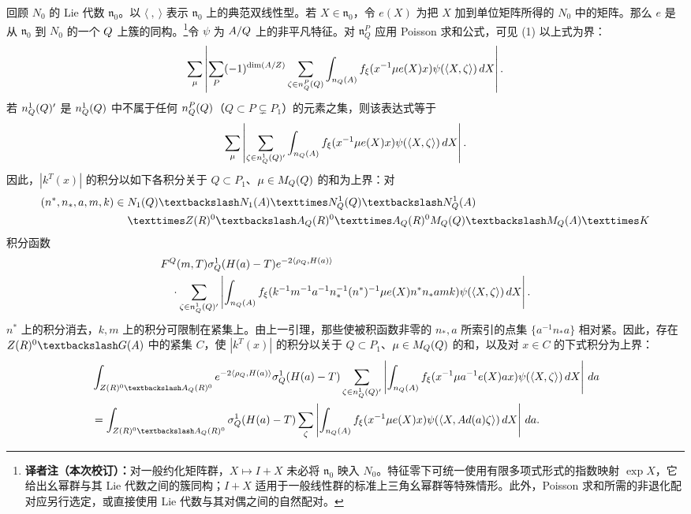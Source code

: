 回顾 $N_0$ 的 Lie 代数 $\mathfrak n_0$。以 $\langle\ ,\ \rangle$ 表示 $\mathfrak n_0$ 上的典范双线性型。若 $X\in\mathfrak n_0$，令 $e(X)$ 为把 $X$ 加到单位矩阵所得的 $N_0$ 中的矩阵。那么 $e$ 是从 $\mathfrak n_0$ 到 $N_0$ 的一个 $Q$ 上簇的同构。\footnote{\textbf{译者注（本次校订）：}对一般约化矩阵群，$X\mapsto I+X$ 未必将 $\mathfrak n_0$ 映入 $N_0$。特征零下可统一使用有限多项式形式的指数映射 $\exp X$，它给出幺幂群与其 Lie 代数之间的簇同构；$I+X$ 适用于一般线性群的标准上三角幺幂群等特殊情形。此外，Poisson 求和所需的非退化配对应另行选定，或直接使用 Lie 代数与其对偶之间的自然配对。}令 $\psi$ 为 $A/Q$ 上的非平凡特征。对 $\mathfrak n_Q^P$ 应用 Poisson 求和公式，可见 (1) 以上式为界：
\[
 \sum_\mu\left|\sum_P(-1)^{\dim(A/Z)}
 \sum_{\zeta\in n_Q^P(Q)}\int_{n_Q(A)}
 f_\xi(x^{-1}\mu e(X)x)\psi(\langle X,\zeta\rangle)\,dX\right|.
\]
若 $n_Q^1(Q)'$ 是 $n_Q^1(Q)$ 中不属于任何
$n_Q^P(Q)$（$Q\subset P\subsetneq P_1$）的元素之集，则该表达式等于
\[
 \sum_\mu\left|\sum_{\zeta\in n_Q^1(Q)'}\int_{n_Q(A)}
 f_\xi(x^{-1}\mu e(X)x)\psi(\langle X,\zeta\rangle)\,dX\right|.
\]
因此，$|k^T(x)|$ 的积分以如下各积分关于 $Q\subset P_1$、$\mu\in M_Q(Q)$ 的和为上界：对
\[
\begin{split}
 (n^*,n_*,a,m,k)\in{}&N_1(\Q)\backslash N_1(A)
 \times N_Q^1(\Q)\backslash N_Q^1(A)\\
 &\times Z(\R)^0\backslash A_Q(\R)^0
 \times A_Q(\R)^0M_Q(\Q)\backslash M_Q(A)\times K
\end{split}
\]
积分函数
\[
\begin{split}
 &F^Q(m,T)\sigma_Q^1(H(a)-T)e^{-2\langle\rho_Q,H(a)\rangle}\\
 &\quad\cdot\sum_{\zeta\in n_Q^1(Q)'}
 \left|\int_{n_Q(A)}
 f_\xi(k^{-1}m^{-1}a^{-1}n_*^{-1}(n^*)^{-1}\mu e(X)n^*n_*amk)
 \psi(\langle X,\zeta\rangle)\,dX\right|.
\end{split}
\]
$n^*$ 上的积分消去，$k,m$ 上的积分可限制在紧集上。由上一引理，那些使被积函数非零的 $n_*,a$ 所索引的点集 $\{a^{-1}n_*a\}$ 相对紧。因此，存在
$Z(\R)^0\backslash G(A)$ 中的紧集 $C$，使 $|k^T(x)|$ 的积分以关于
$Q\subset P_1$、$\mu\in M_Q(Q)$ 的和，以及对 $x\in C$ 的下式积分为上界：
\[
\begin{split}
 &\int_{Z(\R)^0\backslash A_Q(\R)^0}
 e^{-2\langle\rho_Q,H(a)\rangle}\sigma_Q^1(H(a)-T)
 \sum_{\zeta\in\mathfrak n_Q^1(\Q)'}
 \left|\int_{\mathfrak n_Q(A)}f_\xi(x^{-1}\mu a^{-1}e(X)ax)
 \psi(\langle X,\zeta\rangle)\,dX\right|\,da\\
 &=\int_{Z(\R)^0\backslash A_Q(\R)^0}\sigma_Q^1(H(a)-T)
 \sum_\zeta\left|\int_{\mathfrak n_Q(A)}f_\xi(x^{-1}\mu e(X)x)
 \psi(\langle X,\operatorname{Ad}(a)\zeta\rangle)\,dX\right|\,da.
\end{split}
\]

